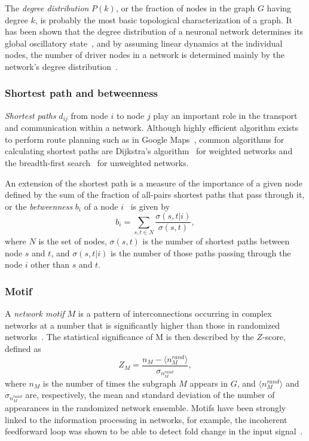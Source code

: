 The \emph{degree distribution} $P(k)$, or the fraction of nodes in the graph 
$G$ having degree $k$, is probably the most basic topological 
characterization of a graph. It has been shown that the degree distribution of
a neuronal network determines its global oscillatory state~\citep{Roxin2011}, 
and by assuming linear dynamics at the individual nodes, 
the number of driver nodes in a network is determined mainly by the 
network's degree distribution~\citep{Liu2011}.

\subsubsection{Shortest path and betweenness}
\label{sec:shortest_path}
\emph{Shortest paths} $d_{ij}$ from node $i$ to node $j$ play an important 
role in the transport and communication 
within a network. Although highly efficient algorithm exists to perform
route planning such as in Google Maps~\citep{Sanders2005}, common algorithms
for calculating shortest paths are Dijkstra's algorithm~\citep{Dijkstra1959} for weighted networks
and the breadth-first search~\citep{West2000} for unweighted networks.

An extension of the shortest path is a measure of the importance of a given 
node defined by the sum of the fraction of all-pairs shortest paths that pass 
through it, or the 
\emph{betweenness} $b_i$ of a node $i$~\citep{Freeman1977} is given by
\begin{equation}
b_i = \sum_{s,t \in N} \frac{\sigma(s,t|i)}{\sigma(s,t)},
\end{equation}
where $N$ is the set of nodes, $\sigma(s,t)$ is the number of shortest paths 
between node $s$ and $t$, and $\sigma(s,t|i)$ is the number of those paths 
passing through the node $i$ other than $s$ and $t$.

\subsubsection{Motif}
A \emph{network motif} $M$ is a pattern of interconnections occurring in complex 
networks at a number that is significantly higher than those in randomized 
networks~\citep{Milo2002,Shen-Orr2002}. The statistical significance of M is 
then described by the $Z$-score, defined as
\begin{equation}
Z_M = \frac{n_M - \langle n_M^{rand} \rangle}{\sigma_{n_M^{rand}}},
\end{equation}
where $n_M$ is the number of times the subgraph $M$ appears in $G$, and 
$\langle n_M^{rand} \rangle$ and $\sigma_{n_M^{rand}}$ are, respectively, 
the mean and 
standard deviation of the number of appearances in the randomized network ensemble.
Motifs have been strongly linked to the information processing in networks, 
for example, the incoherent feedforward loop was shown to be able to detect
fold change in the input signal~\citep{Goentoro2009}.


